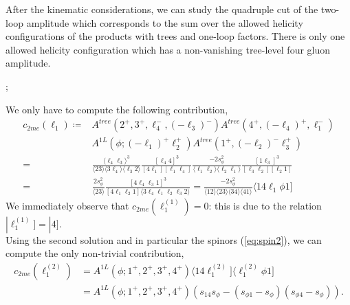 After the kinematic considerations, we can study the quadruple cut of the two-loop amplitude which corresponds to the sum over the allowed helicity configurations of the products with trees and one-loop factors. There is only one allowed helicity configuration which has a non-vanishing tree-level four gluon amplitude. 
\begin{center}
;
\end{center}
We only have to compute the following contribution,
\begin{align*}
	c_{2me}(\ell_1)\coloneqq&A^{tree}(2^+,3^+,\ell_4^-,(-\ell_3)^-) A^{tree}(4^+,(-\ell_4)^+, \ell_1^-) \\&A^{1L}(\phi;(-\ell_1)^+\ell_2^+)A^{tree}(1^+,(-\ell_2)^-\ell_3^+)\\
	=&\frac{\langle \ell_4 \ell_3\rangle^3}{\langle 23 \rangle \langle 3\ell_4 \rangle \langle \ell_3 2\rangle}\frac{[\ell_4 4]^3}{[4\ell_1][\ell_1\ell_4]}\frac{-2s_\phi^2}{\langle \ell_1 \ell_2\rangle\langle \ell_2\ell_1\rangle}\frac{[1\ell_3]^3}{[\ell_3\ell_2][\ell_2 1]}\\
	=&\frac{2s_\phi^2}{\langle 23\rangle}\frac{[4\ell_4\ell_3 1]^3}{[4\ell_1\ell_2 1]\langle 3\ell_4\ell_1\ell_2\ell_3 2\rangle}=\frac{-2 s_\phi^2}{\langle 12 \rangle \langle 23 \rangle\langle 34 \rangle\langle 41 \rangle} \langle 14\ell_1 \phi 1]
\end{align*}
We immediately observe that $c_{2me}(\ell_1^{(1)})=0$: this is due to the relation $|\ell_1^{(1)}]=|4]$.\\Using the second solution and in particular the spinors (\ref{eq:spin2}), we can compute the only non-trivial contribution,
\begin{align*}
	c_{2me}(\ell_1^{(2)})&=A^{1L}(\phi;1^+,2^+,3^+,4^+) \langle 14\ell_1^{(2)}]\langle \ell_1^{(2)} \phi 1]\\
	&=A^{1L}(\phi;1^+,2^+,3^+,4^+) \left(s_{14}s_\phi-(s_{\phi 1}-s_\phi)(s_{\phi 4}-s_\phi)\right).
\end{align*}

